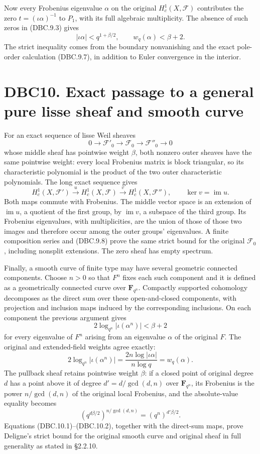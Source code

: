 \documentclass[
]{report}
\begin{document}
Now every Frobenius eigenvalue \(\alpha\) on the original
\(H_c^1(X,\mathcal F)\) contributes the zero \(t=(\iota\alpha)^{-1}\) to
\(P_1\), with its full algebraic multiplicity. The absence of such zeros
in (DBC.9.3) gives \[
|\iota\alpha|<q^{1+\beta/2},
\qquad
\boxed{w_q(\alpha)<\beta+2}.
\tag{DBC.9.8}
\] The strict inequality comes from the boundary nonvanishing and the
exact pole-order calculation (DBC.9.7), in addition to Euler convergence
in the interior.

\section{DBC10. Exact passage to a general pure lisse sheaf and smooth
curve}\label{dbc10.-exact-passage-to-a-general-pure-lisse-sheaf-and-smooth-curve}

For an exact sequence of lisse Weil sheaves \[
0\longrightarrow\mathcal F'_0\longrightarrow\mathcal F_0
\longrightarrow\mathcal F''_0\longrightarrow0
\] whose middle sheaf has pointwise weight \(\beta\), both nonzero outer
sheaves have the same pointwise weight: every local Frobenius matrix is
block triangular, so its characteristic polynomial is the product of the
two outer characteristic polynomials. The long exact sequence gives \[
H_c^1(X,\mathcal F')\xrightarrow{u}H_c^1(X,\mathcal F)
\xrightarrow{v}H_c^1(X,\mathcal F''),\qquad\ker v=\operatorname{im}u.
\] Both maps commute with Frobenius. The middle vector space is an
extension of \(\operatorname{im}u\), a quotient of the first group, by
\(\operatorname{im}v\), a subspace of the third group. Its Frobenius
eigenvalues, with multiplicities, are the union of those of those two
images and therefore occur among the outer groups' eigenvalues. A finite
composition series and (DBC.9.8) prove the same strict bound for the
original \(\mathcal F_0\), including nonsplit extensions. The zero sheaf
has empty spectrum.

Finally, a smooth curve of finite type may have several geometric
connected components. Choose \(n>0\) so that \(F^n\) fixes each such
component and it is defined as a geometrically connected curve over
\(\mathbf F_{q^n}\). Compactly supported cohomology decomposes as the
direct sum over these open-and-closed components, with projection and
inclusion maps induced by the corresponding inclusions. On each
component the previous argument gives \[
2\log_{q^n}|\iota(\alpha^n)|<\beta+2
\] for every eigenvalue of \(F^n\) arising from an eigenvalue \(\alpha\)
of the original \(F\). The original and extended-field weights agree
exactly: \[
2\log_{q^n}|\iota(\alpha^n)|
=\frac{2n\log|\iota\alpha|}{n\log q}
=w_q(\alpha).
\tag{DBC.10.1}
\] The pullback sheaf retains pointwise weight \(\beta\): if a closed
point of original degree \(d\) has a point above it of degree
\(d'=d/\gcd(d,n)\) over \(\mathbf F_{q^n}\), its Frobenius is the power
\(n/\gcd(d,n)\) of the original local Frobenius, and the absolute-value
equality becomes \[
(q^{d\beta/2})^{n/\gcd(d,n)}
=(q^n)^{d'\beta/2}.
\tag{DBC.10.2}
\] Equations (DBC.10.1)--(DBC.10.2), together with the direct-sum maps,
prove Deligne's strict bound for the original smooth curve and original
sheaf in full generality as stated in §2.2.10.
\end{document}
